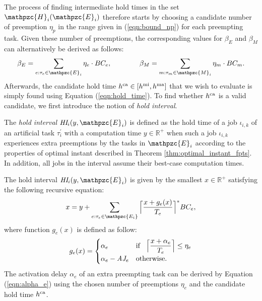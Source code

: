 The process of finding intermediate hold times in the set $\mathpzc{H}_i(\mathpzc{E}_i)$ therefore starts by choosing a candidate number of preemption $\eta_p$ in the range given in (\ref{eqn:bound_np}) for each preempting task. Given these number of preemptions, the corresponding values for $\beta_E$ and $\beta_M$ can alternatively be derived as follows:
\begin{align} \label{eqn:beta_2}
\beta_E = \sum\limits_{e:\tau_e \in \mathpzc{E}_i} \eta_e \cdot BC_e, \text{\hspace{14mm}}
\beta_M = \sum\limits_{m:\tau_m \in \mathpzc{M}_i} \eta_m \cdot BC_m.
\end{align}
Afterwards, the candidate hold time $h^{\rm{ca}}\in[h^{\rm{mi}}, h^{\rm{ma}}]$ that we wish to evaluate is simply found using Equation (\ref{eqn:hold_time}). To find whether $h^{\rm{ca}}$ is a valid candidate, we first introduce the notion of \textit{hold interval}.

\begin{definition} \label{def:hold_interval}
	The \textit{hold interval} $\hi_i(y,\mathpzc{E}_i)$ is defined as the hold time of a job $\iota_{i,k}$ of an artificial task $\tau^{\prime}_i$ with a computation time $y \in \mathbb{R}^+$ when such a job $\iota_{i,k}$ experiences extra preemptions by the tasks in $\mathpzc{E}_i$ according to the properties of optimal instant described in Theorem \ref{thm:optimal_instant_fpts}. In addition, all jobs in the interval assume their best-case computation times.
\end{definition}

The hold interval $\hi_i(y,\mathpzc{E}_i)$ is given by the smallest $x \in \mathbb{R}^+$ satisfying the following recursive equation:
\begin{align} \label{eqn:hold_interval}
x = y + \sum\limits_{e:\tau_e \in \mathpzc{E_i}}\Big\lceil  \dfrac{x+ g_e(x)}{T_e}\Big\rceil^{*}  BC_e,
\end{align}
where function $g_e(x)$ is defined as follow:
\begin{align}
	g_e(x) = 
	\begin{cases} 
	\alpha_e & \text{if} \hspace{3mm} \Big\lceil \dfrac{x+ \alpha_e}{T_e} \Big\rceil \leq \eta_e \\
	\alpha_e - \mbox{\it AJ}_e & \text{otherwise.}
	\end{cases}
\end{align}
The activation delay $\alpha_e$ of an extra preempting task can be derived by Equation (\ref{eqn:alpha_e}) using the chosen number of preemptions $\eta_e$ and the candidate hold time $h^{\rm{ca}}$.

